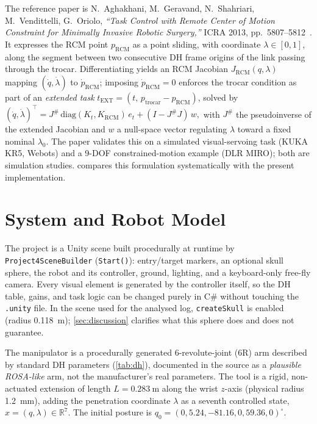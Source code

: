 \documentclass[11pt,a4paper]{article}
\newcommand{\code}[1]{\texttt{#1}}
\begin{document}
The reference paper is N.~Aghakhani, M.~Geravand, N.~Shahriari, M.~Vendittelli, G.~Oriolo, \emph{``Task Control with Remote Center of Motion Constraint for Minimally Invasive Robotic Surgery,''} ICRA 2013, pp.~5807--5812~\cite{aghakhani2013}. It expresses the RCM point $p_{\mathrm{RCM}}$ as a point sliding, with coordinate $\lambda\in[0,1]$, along the segment between two consecutive DH frame origins of the link passing through the trocar. Differentiating yields an RCM Jacobian $J_{\mathrm{RCM}}(q,\lambda)$ mapping $(\dot q,\dot\lambda)$ to $\dot p_{\mathrm{RCM}}$; imposing $\dot p_{\mathrm{RCM}}=0$ enforces the trocar condition as part of an \emph{extended task} $t_{\mathrm{EXT}}=(t,\,p_{\mathrm{trocar}}-p_{\mathrm{RCM}})$, solved by
$
(\dot q,\dot\lambda)^{\!\top} = J^{\#}\,\mathrm{diag}(K_t,K_{\mathrm{RCM}})\,e_t + (I-J^{\#}J)\,w,
$
with $J^{\#}$ the pseudoinverse of the extended Jacobian and $w$ a null-space vector regulating $\lambda$ toward a fixed nominal $\lambda_0$. The paper validates this on a simulated visual-servoing task (KUKA KR5, Webots) and a 9-DOF constrained-motion example (DLR MIRO); both are simulation studies.  compares this formulation systematically with the present implementation.

\section{System and Robot Model}
\label{sec:architecture}

The project is a Unity scene built procedurally at runtime by \code{Project4SceneBuilder} (\code{Start()}): entry/target markers, an optional skull sphere, the robot and its controller, ground, lighting, and a keyboard-only free-fly camera. Every visual element is generated by the controller itself, so the DH table, gains, and task logic can be changed purely in C\# without touching the \code{.unity} file. In the scene used for the analysed log, \code{createSkull} is enabled (radius \SI{0.118}{\meter}); \cref{sec:discussion} clarifies what this sphere does and does not guarantee.

The manipulator is a procedurally generated 6-revolute-joint (6R) arm described by standard DH parameters (\cref{tab:dh}), documented in the source as a \emph{plausible ROSA-like} arm, not the manufacturer's real parameters. The tool is a rigid, non-actuated extension of length $L=\SI{0.283}{\meter}$ along the wrist $z$-axis (physical radius \SI{1.2}{\milli\meter}), adding the penetration coordinate $\lambda$ as a seventh controlled state, $x=(q,\lambda)\in\mathbb{R}^7$. The initial posture is $q_0=(0,5.24,-81.16,0,59.36,0)^{\circ}$.
\end{document}
